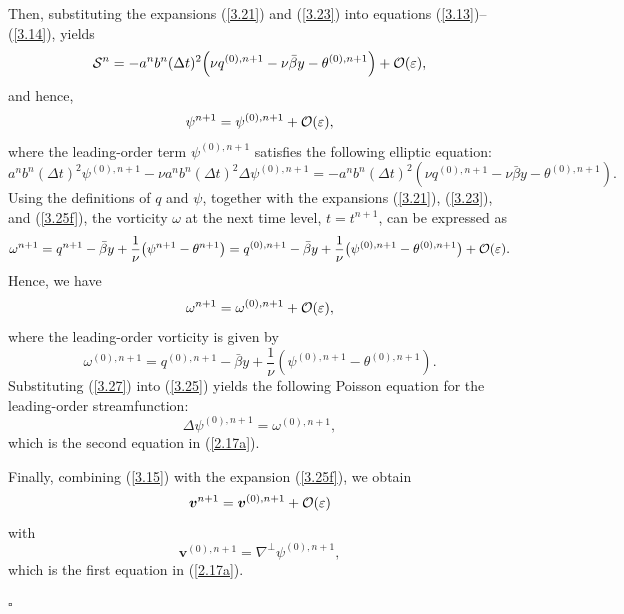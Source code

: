 \documentclass[a4paper,11pt,twoside]{article}
\newenvironment{proof}{{\flushleft \bf Proof:}}{\hfill$\square$\par}
\numberwithin{equation}{section}
\numberwithin{figure}{section}
\numberwithin{table}{section}
\newcommand{\eps}{\varepsilon}
\newcommand{\dt}{\Delta t}
\newcommand{\bv}{\bm{v}}
\newcommand\eref[1]{(\ref{#1})}
\begin{document}
\begin{proof}
Then, substituting the expansions \eref{3.21} and \eref{3.23} into equations \eref{3.13}--\eref{3.14}, yields
\begin{equation*}
{\cal S}^n=-a^nb^n(\dt)^2\Big(\nu q^{(0),n+1}-\nu\bar{\beta}y-\theta^{(0),n+1}\Big)+{\cal O}(\eps),
\end{equation*}
and hence,
\begin{equation}
\psi^{n+1}=\psi^{(0),n+1}+{\cal O}(\eps),
\label{3.25f}
\end{equation}
where the leading-order term $\psi^{(0),n+1}$ satisfies the following elliptic equation:
\begin{equation}
a^nb^n(\dt)^2\psi^{(0),n+1}-\nu a^nb^n(\dt)^2\Delta\psi^{(0),n+1}=
-a^nb^n(\dt)^2\left(\nu q^{(0),n+1}-\nu\bar{\beta}y-\theta^{(0),n+1}\right).
\label{3.25}
\end{equation}
Using the definitions of $q$ and $\psi$, together with the expansions \eref{3.21}, \eref{3.23}, and \eref{3.25f}, the vorticity $\omega$ at
the next time level, $t=t^{n+1}$, can be expressed as
\begin{equation*}
\omega^{n+1}=q^{n+1}-\bar{\beta}y+\frac{1}{\nu}\big(\psi^{n+1}-\theta^{n+1}\big)=q^{(0),n+1}-\bar{\beta}y+
\frac{1}{\nu}\big(\psi^{(0),n+1}-\theta^{(0),n+1}\big)+{\cal O}(\eps).
\end{equation*}
Hence, we have
\begin{equation}
\omega^{n+1}=\omega^{(0),n+1}+{\cal O}(\eps),
\label{3.27f}
\end{equation}
where the leading-order vorticity is given by
\begin{equation}
\omega^{(0),n+1}=q^{(0),n+1}-\bar{\beta}y+\frac{1}{\nu}\left(\psi^{(0),n+1}-\theta^{(0),n+1}\right).
\label{3.27}
\end{equation}
Substituting \eref{3.27} into \eref{3.25} yields the following Poisson equation for the leading-order streamfunction:
\begin{equation}
\Delta\psi^{(0),n+1}=\omega^{(0),n+1},
\label{3.29}
\end{equation}
which is the second equation in \eref{2.17a}.
		
Finally, combining \eref{3.15} with the expansion \eref{3.25f}, we obtain
\begin{equation}
\bv^{n+1}=\bv^{(0),n+1}+{\cal O}(\eps)
\label{3.30}
\end{equation}
with
\begin{equation}
\bv^{(0),n+1}=\nabla^\perp\psi^{(0),n+1},
\label{3.31f}
\end{equation}	
which is the first equation in \eref{2.17a}.
		

\end{proof}
\end{document}
